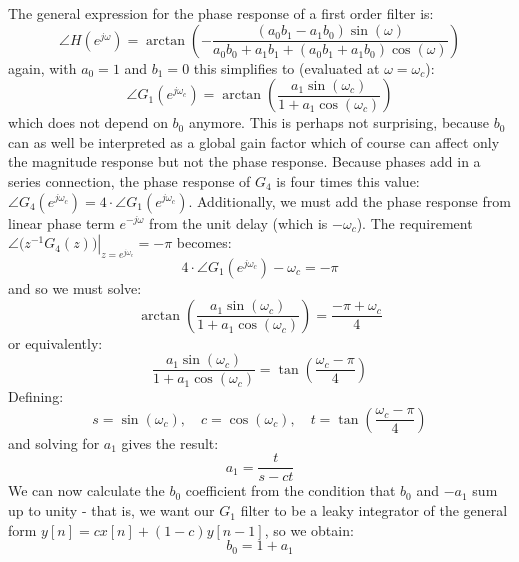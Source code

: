 The general expression for the phase response of a first order filter is:
\begin{equation}
 \angle H(e^{j \omega}) = \arctan \left(- \frac{(a_0 b_1 - a_1 b_0) \sin (\omega)}
                                               {a_0 b_0 + a_1 b_1 + (a_0 b_1 + a_1 b_0) \cos (\omega)} \right)
\end{equation}
again, with $a_0=1$ and $b_1=0$ this simplifies to (evaluated at $\omega=\omega_c$):
\begin{equation}
 \angle G_1(e^{j \omega_c}) = \arctan \left(\frac{a_1 \sin (\omega_c)}
                                                 {1 + a_1 \cos (\omega_c)} \right)
\end{equation}
which does not depend on $b_0$ anymore. This is perhaps not surprising, because $b_0$ can as well be interpreted as a global gain factor which of course can affect only the magnitude response but not the phase response. Because phases add in a series connection, the phase response of $G_4$ is four times this value: $\angle G_4(e^{j \omega_c}) = 4 \cdot \angle G_1(e^{j \omega_c})$. Additionally, we must add the phase response from linear phase term $e^{-j \omega}$ from the unit delay (which is $-\omega_c$). The requirement $\left. \angle \big( z^{-1} G_4(z) \big) \right|_{z=e^{j \omega_c}} = -\pi$ becomes: 
\begin{equation}
4 \cdot \angle G_1(e^{j \omega_c}) - \omega_c = -\pi
\end{equation}
and so we must solve:
\begin{equation}
 \arctan \left(\frac{a_1 \sin (\omega_c)} {1 + a_1 \cos (\omega_c)} \right)
 = \frac{-\pi + \omega_c}{4}
\end{equation}
or equivalently:
\begin{equation}
 \frac{a_1 \sin (\omega_c)} {1 + a_1 \cos (\omega_c)}
 = \tan \left( \frac{\omega_c -\pi}{4} \right)
\end{equation}
Defining:
\begin{equation}
\label{eqn:sct}
\boxed
{
 s = \sin(\omega_c), \quad c = \cos(\omega_c), \quad t = \tan \left( \frac{\omega_c-\pi}{4} \right)
}
\end{equation}
and solving for $a_1$ gives the result:
\begin{equation}
\boxed
{
 a_1 =  \frac{t}{s - c t}
}
\end{equation}
We can now calculate the $b_0$ coefficient from the condition that $b_0$ and $-a_1$ sum up to unity - that is, we want our $G_1$ filter to be a leaky integrator of the general form $y[n] = c x[n] + (1-c) y[n-1]$, so we obtain:
\begin{equation}
\boxed
{
 b_0 = 1 + a_1
}
\end{equation}


